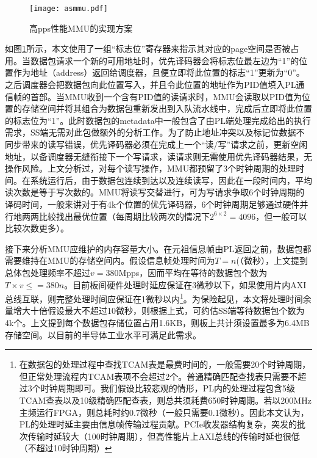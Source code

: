 \begin{figure}[!ht]
	\centering 
	\texttt{[image: asmmu.pdf]}
	\caption{高pps性能MMU的实现方案} \label{fig:asmmu}
\end{figure}

如图\ref{fig:asmmu}所示，本文使用了一组“标志位”寄存器来指示其对应的page空间是否被占用。当数据包请求一个新的可用地址时，优先译码器会将标志位最左边为“1”的位置作为地址（address）返回给调度器，且便立即将此位置的标志“1”更新为“0”。之后调度器会把数据包向此位置写入，并且令此位置的地址作为PID值填入PL通信帧的首部。当MMU收到一个含有PID值的读请求时，MMU会读取以PID值为位置的存储空间并将其组合为数据包重新发出到入队流水线中，完成后立即将此位置的标志位为“1”。此时数据包的metadata中一般包含了由PL端处理完成给出的执行需求，SS端无需对此包做额外的分析工作。为了防止地址冲突以及标记位数据不同步带来的读写错误，优先译码器必须在完成上一个“读/写”请求之前，更新空闲地址，以备调度器无缝衔接下一个写请求，读请求则无需使用优先译码器结果，无操作风险。上文分析过，对每个读写操作，MMU都预留了3个时钟周期的处理时间。在系统运行后，由于数据包连续到达以及连续读写，因此在一段时间内，平均读次数是等于写次数的。MMU将读写交替进行，可为写请求争取6个时钟周期的译码时间，一般来讲对于有4k个位置的优先译码器，6个时钟周期足够通过硬件并行地两两比较找出最优位置（每周期比较两次的情况下$2^{6\times2}=4096$，但一般可以比较次数更多）。

接下来分析MMU应维护的内存容量大小。在元祖信息帧由PL返回之前，数据包都需要维持在MMU的存储空间内。假设信息帧处理时间为$T=n$(（微秒），上文提到总体包处理频率不超过$v=$380Mpps，因而平均在等待的数据包个数为$T \times v \leq =380n$。目前板间硬件处理时延应保证在3微秒以下，如果使用片内AXI总线互联，则完整处理时间应保证在1微秒以内\footnote{在数据包的处理过程中查找TCAM表是最费时间的，一般需要20个时钟周期，但正常处理流程内TCAM表项不会超过2个。普通精确匹配查找表只需要不超过3个时钟周期即可。我们假设比较悲观的情形，PL内的处理过程包含5级TCAM查表以及10级精确匹配查表，则总共须耗费650时钟周期。若以200MHz主频运行FPGA，则总耗时约0.7微秒（一般只需要0.1微秒）。因此本文认为，PL的处理时延主要由信息帧传输过程贡献。PCIe收发器结构复杂，突发的批次传输时延较大（100时钟周期），但高性能片上AXI总线的传输时延也很低（不超过10时钟周期）}。为保险起见，本文将处理时间余量增大十倍假设最大不超过10微秒，则根据上式，可约估SS端等待数据包个数为4k个。上文提到每个数据包存储位置占用1.6KB，则板上共计须设置最多为6.4MB存储空间。以目前的半导体工业水平可满足此需求。





